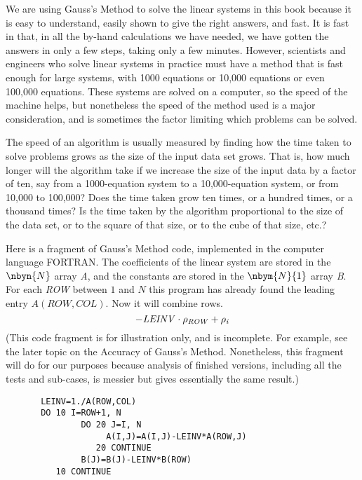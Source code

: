 %
%
We are using Gauss's Method to solve the linear systems in this book
because it is easy to understand, easily shown to give the right
answers, and fast.
It is fast in that, in all the by-hand calculations we have needed, 
we have gotten the answers in only a few steps, taking only a few minutes.
However,
scientists and engineers who solve linear systems in practice must 
have a method that is fast enough for large
systems, with 1000 equations or 10,000 equations or even 100,000 equations.
These systems are solved on a computer, so the speed of the
machine helps, but nonetheless the speed of the method used is a major
consideration, and is sometimes the factor limiting which problems
can be solved. 

The speed of an algorithm is usually measured by finding 
how the time taken to solve problems grows as the size of
the input data set grows. 
That is, how much longer will the algorithm take if
we increase the size of the input data by a
factor of ten, say from a 1000-equation system to a 10,000-equation
system, or from 10,000 to 100,000?
Does the time taken grow ten times,
or a hundred times, or a thousand times?
Is the time taken by the algorithm proportional to the size of the data set, 
or to the square of that size, or to the cube of that size, etc.? 

Here is a fragment of Gauss's Method code, implemented in the computer
language FORTRAN.
The coefficients of the linear system are stored in the 
$\nbyn{N}$ array \textit{A}, and the constants are stored in the 
$\nbym{N}{1}$ array \textit{B}.
For each \textit{ROW} between $1$ and $N$ this program
has already found the leading entry $A(ROW,COL)$.
Now it will combine rows.
\begin{equation*}
  -\text{\textit{LEINV}}\cdot \rho_{\text{\textit{ROW}}}
      +\rho_{\text{\textit{i}}}
\end{equation*}
(This code fragment is for illustration only, and is incomplete.
For example, see the later topic on the Accuracy of Gauss's Method.
Nonetheless, this fragment will do for our purposes because
analysis of finished versions, including all the tests
and sub-cases, is messier but gives essentially the same result.)
\begin{center}{\small
\begin{verbatim}
       LEINV=1./A(ROW,COL)
       DO 10 I=ROW+1, N
               DO 20 J=I, N
                    A(I,J)=A(I,J)-LEINV*A(ROW,J)
                  20 CONTINUE
               B(J)=B(J)-LEINV*B(ROW)
          10 CONTINUE
\end{verbatim} 
}\end{center}

